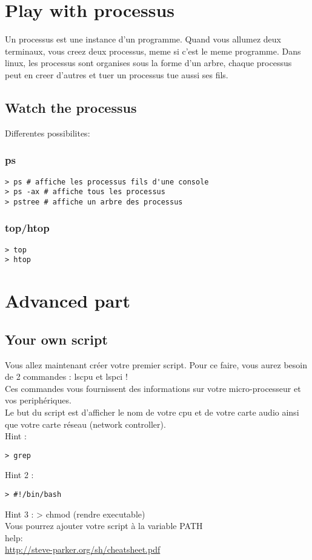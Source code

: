 \documentclass[a4paper]{article}
\begin{document}
\section{Play with processus}
Un processus est une instance d'un programme. Quand vous allumez deux terminaux,
vous creez deux processus, meme si c'est le meme programme. Dans linux, les
processus sont organises sous la forme d'un arbre, chaque processus peut en
creer d'autres et tuer un processus tue aussi ses fils.
\subsection{Watch the processus}
Differentes possibilites:
\subsubsection{ps}
\begin{lstlisting}
> ps # affiche les processus fils d'une console
> ps -ax # affiche tous les processus
> pstree # affiche un arbre des processus
\end{lstlisting}
\subsubsection{top/htop}
\begin{lstlisting}
> top
> htop
\end{lstlisting}
\section{Advanced part}

\subsection{Your own script}
Vous allez maintenant créer votre premier script. Pour ce faire, vous aurez 
besoin de 2 commandes : lscpu et lspci !\\
Ces commandes vous fournissent des informations sur votre micro-processeur et 
vos periphériques.\\
Le but du script est d'afficher le nom de votre cpu et de votre carte audio 
ainsi que votre carte réseau (network controller).\\
Hint : 
\begin{lstlisting}
> grep 
\end{lstlisting}
Hint 2 : 
\begin{lstlisting}
> #!/bin/bash
\end{lstlisting}
Hint 3 :
> chmod (rendre executable)
\\
Vous pourrez ajouter votre script à la variable PATH\\
help: \\
\url{http://steve-parker.org/sh/cheatsheet.pdf}
\end{document}

